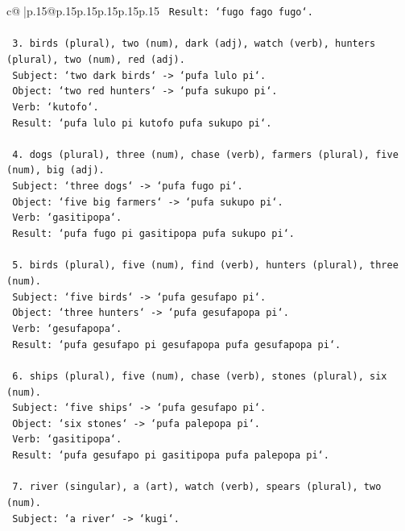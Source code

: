 \documentclass{article}
\begin{document}
{\begin{supertabular}{c@{$\;$}|p{.15\linewidth}@{}p{.15\linewidth}p{.15\linewidth}p{.15\linewidth}p{.15\linewidth}p{.15\linewidth}}
{{{\texttt{       Result: `fugo fago fugo`.} \\
\\ 
\texttt{    3. birds (plural), two (num), dark (adj), watch (verb), hunters (plural), two (num), red (adj).} \\
\texttt{       Subject: `two dark birds` {-}> `pufa lulo pi`.} \\
\texttt{       Object: `two red hunters` {-}> `pufa sukupo pi`.} \\
\texttt{       Verb: `kutofo`.} \\
\texttt{       Result: `pufa lulo pi kutofo pufa sukupo pi`.} \\
\\ 
\texttt{    4. dogs (plural), three (num), chase (verb), farmers (plural), five (num), big (adj).} \\
\texttt{       Subject: `three dogs` {-}> `pufa fugo pi`.} \\
\texttt{       Object: `five big farmers` {-}> `pufa sukupo pi`.} \\
\texttt{       Verb: `gasitipopa`.} \\
\texttt{       Result: `pufa fugo pi gasitipopa pufa sukupo pi`.} \\
\\ 
\texttt{    5. birds (plural), five (num), find (verb), hunters (plural), three (num).} \\
\texttt{       Subject: `five birds` {-}> `pufa gesufapo pi`.} \\
\texttt{       Object: `three hunters` {-}> `pufa gesufapopa pi`.} \\
\texttt{       Verb: `gesufapopa`.} \\
\texttt{       Result: `pufa gesufapo pi gesufapopa pufa gesufapopa pi`.} \\
\\ 
\texttt{    6. ships (plural), five (num), chase (verb), stones (plural), six (num).} \\
\texttt{       Subject: `five ships` {-}> `pufa gesufapo pi`.} \\
\texttt{       Object: `six stones` {-}> `pufa palepopa pi`.} \\
\texttt{       Verb: `gasitipopa`.} \\
\texttt{       Result: `pufa gesufapo pi gasitipopa pufa palepopa pi`.} \\
\\ 
\texttt{    7. river (singular), a (art), watch (verb), spears (plural), two (num).} \\
\texttt{       Subject: `a river` {-}> `kugi`.} \\
}}}
\end{supertabular}}
\end{document}
